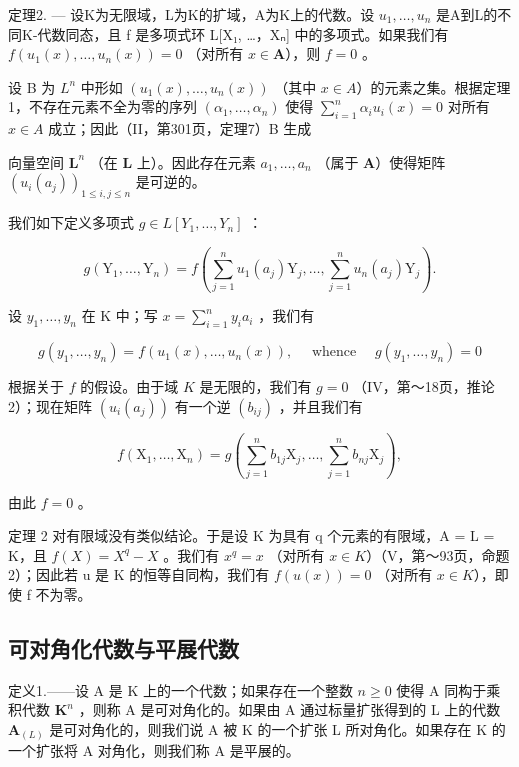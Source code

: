 定理2. --- 设K为无限域，L为K的扩域，A为K上的代数。设 \(u_1, \ldots, u_n\) 是A到L的不同K-代数同态，且 f 是多项式环 L{[}X₁, \ldots，Xₙ{]} 中的多项式。如果我们有 \(f(u_1(x), \ldots, u_n(x)) = 0\) （对所有 \(x \in \mathbf{A}\)），则 \(f = 0\) 。

设 B 为 \(L^{n}\) 中形如 \((u_{1}(x), \ldots, u_{n}(x))\) （其中 \(x \in A\)）的元素之集。根据定理 1，不存在元素不全为零的序列 \((\alpha_{1}, \ldots, \alpha_{n})\) 使得 \(\sum_{i=1}^{n} \alpha_{i} u_{i}(x) = 0\) 对所有 \(x \in A\) 成立；因此（II，第301页，定理7）B 生成

向量空间 \(\mathbf{L}^n\) （在 \(\mathbf{L}\) 上）。因此存在元素 \(a_1, \ldots, a_n\) （属于 \(\mathbf{A}\)）使得矩阵 \((u_i(a_j))_{1 \leqslant i, j \leqslant n}\) 是可逆的。

我们如下定义多项式 \(g \in L[Y_1, \ldots, Y_n]\) ：

\[
g \left(\mathrm{Y} _ {1}, \dots , \mathrm{Y} _ {n}\right) = f \left(\sum_ {j = 1} ^ {n} u _ {1} \left(a _ {j}\right) \mathrm{Y} _ {j}, \dots , \sum_ {j = 1} ^ {n} u _ {n} \left(a _ {j}\right) \mathrm{Y} _ {j}\right).\tag{3}
\]

设 \(y_{1}, \ldots, y_{n}\) 在 K 中；写 \(x = \sum_{i=1}^{n} y_{i} a_{i}\) ，我们有

\[
g \left(y _ {1}, \dots , y _ {n}\right) = f \left(u _ {1} (x), \dots , u _ {n} (x)\right), \quad \text { whence } \quad g \left(y _ {1}, \dots , y _ {n}\right) = 0
\]

根据关于 \(f\) 的假设。由于域 \(K\) 是无限的，我们有 \(g = 0\) （IV，第～18页，推论 2）；现在矩阵 \((u_i(a_j))\) 有一个逆 \((b_{ij})\) ，并且我们有

\[
f \left(\mathrm{X} _ {1}, \dots , \mathrm{X} _ {n}\right) = g \left(\sum_ {j = 1} ^ {n} b _ {1 j} \mathrm{X} _ {j}, \dots , \sum_ {j = 1} ^ {n} b _ {n j} \mathrm{X} _ {j}\right),\tag{4}
\]

由此 \(f = 0\) 。

定理 2 对有限域没有类似结论。于是设 K 为具有 q 个元素的有限域，A = L = K，且 \(f(X) = X^{q} - X\) 。我们有 \(x^{q} = x\) （对所有 \(x \in K\)）（V，第～93页，命题 2）；因此若 u 是 K 的恒等自同构，我们有 \(f(u(x)) = 0\) （对所有 \(x \in K\)），即使 f 不为零。

\subsection{可对角化代数与平展代数}

定义1.——设 A 是 K 上的一个代数；如果存在一个整数 \(n \geqslant 0\) 使得 A 同构于乘积代数 \(\mathbf{K}^n\) ，则称 A 是可对角化的。如果由 A 通过标量扩张得到的 L 上的代数 \(\mathbf{A}_{(L)}\) 是可对角化的，则我们说 A 被 K 的一个扩张 L 所对角化。如果存在 K 的一个扩张将 A 对角化，则我们称 A 是平展的。

